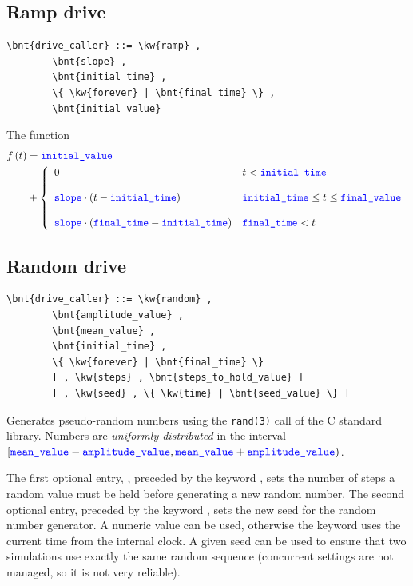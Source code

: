 \subsection{Ramp drive}
\begin{Verbatim}[commandchars=\\\{\}]
    \bnt{drive_caller} ::= \kw{ramp} ,
        \bnt{slope} , 
        \bnt{initial_time} ,
        \{ \kw{forever} | \bnt{final_time} \} ,
        \bnt{initial_value}
\end{Verbatim}
The function
\begin{align}
	f\plbr{t} &= \nt{initial\_value} \nonumber \\
	&+ \lcubr{\matr{ll}{
		0
			& t < \nt{initial\_time} \\
		\\
		\nt{slope} \cdot \plbr{t - \nt{initial\_time}}
			& \nt{initial\_time} \le t \le \nt{final\_value} \\
		\\
		\nt{slope} \cdot \plbr{\nt{final\_time} - \nt{initial\_time}}
			& \nt{final\_time} < t
	}}
\end{align}

\subsection{Random drive}
\begin{Verbatim}[commandchars=\\\{\}]
    \bnt{drive_caller} ::= \kw{random} ,
        \bnt{amplitude_value} ,
        \bnt{mean_value} ,
        \bnt{initial_time} ,
        \{ \kw{forever} | \bnt{final_time} \}
        [ , \kw{steps} , \bnt{steps_to_hold_value} ]
        [ , \kw{seed} , \{ \kw{time} | \bnt{seed_value} \} ]
\end{Verbatim}
Generates pseudo-random numbers using the \texttt{rand(3)} call
of the C standard library.
Numbers are \emph{uniformly distributed} in the interval
$[\nt{mean\_value} - \nt{amplitude\_value}, \nt{mean\_value} + \nt{amplitude\_value})$.

The first optional entry, ,
preceded by the keyword , sets the
number of steps a random value must be held before generating a new
random number.
The second optional entry, preceded by the keyword
, sets the new seed for the random number generator.
A numeric  value can be used,
otherwise the keyword  uses the current time from
the internal clock.
A given seed can be used to ensure that two
simulations use exactly the same random sequence (concurrent settings 
are not managed, so it is not very reliable).

